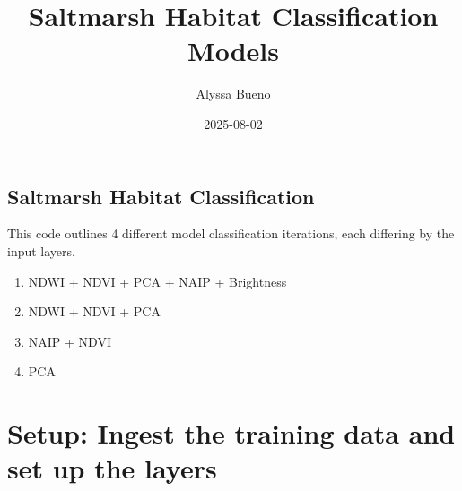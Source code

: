 \documentclass[
]{article}
\title{Saltmarsh Habitat Classification Models}
\author{Alyssa Bueno}
\date{2025-08-02}
\providecommand{\tightlist}{%
  \setlength{\itemsep}{0pt}\setlength{\parskip}{0pt}}
\begin{document}
\maketitle

\subsection{Saltmarsh Habitat
Classification}\label{saltmarsh-habitat-classification}

This code outlines 4 different model classification iterations, each
differing by the input layers.

\begin{enumerate}
\def\labelenumi{\arabic{enumi}.}
\tightlist
\item
  NDWI + NDVI + PCA + NAIP + Brightness
\item
  NDWI + NDVI + PCA
\item
  NAIP + NDVI
\item
  PCA
\end{enumerate}

\section{Setup: Ingest the training data and set up the
layers}\label{setup-ingest-the-training-data-and-set-up-the-layers}
\end{document}
